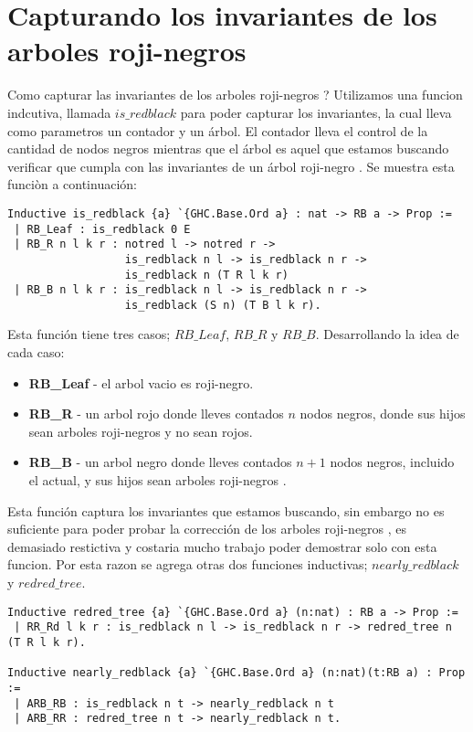 \documentclass[letterpaper,12pt,oneside]{book}
\newcommand{\arn}{árbol roji-negro }
\newcommand{\arns}{arboles roji-negros }
\theoremstyle{plain}
\theoremstyle{definition}
\theoremstyle{remark}
\begin{document}
\section{Capturando los invariantes de los \arns}
Como capturar las invariantes de los \arns ? Utilizamos una funcion indcutiva, llamada $is\_redblack$
para poder capturar los invariantes, la cual lleva como parametros un contador y un \'arbol. El contador
lleva el control de la cantidad de nodos negros mientras que el \'arbol es aquel que estamos buscando
verificar que cumpla con las invariantes de un \arn. Se muestra esta funci\`on a continuaci\'on:

\begin{verbatim}
Inductive is_redblack {a} `{GHC.Base.Ord a} : nat -> RB a -> Prop :=
 | RB_Leaf : is_redblack 0 E
 | RB_R n l k r : notred l -> notred r ->
                  is_redblack n l -> is_redblack n r ->
                  is_redblack n (T R l k r)
 | RB_B n l k r : is_redblack n l -> is_redblack n r ->
                  is_redblack (S n) (T B l k r).
\end{verbatim}

Esta funci\'on tiene tres casos; $RB\_Leaf$, $RB\_R$ y $RB\_B$. Desarrollando la idea de cada caso:
\begin{itemize}
        \item \textbf{RB\_Leaf} - el arbol vacio es roji-negro.
        \item \textbf{RB\_R} - un arbol rojo donde lleves contados $n$ nodos negros, donde sus hijos sean \arns y no sean rojos.
        \item \textbf{RB\_B} - un arbol negro donde lleves contados $n+1$ nodos negros, incluido el actual, y sus hijos sean \arns.
\end{itemize}

Esta funci\'on captura los invariantes que estamos buscando, sin embargo no es suficiente para poder probar la correcci\'on de los \arns,
es demasiado restictiva y costaria mucho trabajo poder demostrar solo con esta funcion. Por esta razon se agrega otras dos funciones inductivas;
$nearly\_redblack$ y $redred\_tree$. 

\begin{verbatim}
Inductive redred_tree {a} `{GHC.Base.Ord a} (n:nat) : RB a -> Prop :=
 | RR_Rd l k r : is_redblack n l -> is_redblack n r -> redred_tree n (T R l k r).

Inductive nearly_redblack {a} `{GHC.Base.Ord a} (n:nat)(t:RB a) : Prop :=
 | ARB_RB : is_redblack n t -> nearly_redblack n t
 | ARB_RR : redred_tree n t -> nearly_redblack n t.
\end{verbatim}
\end{document}
